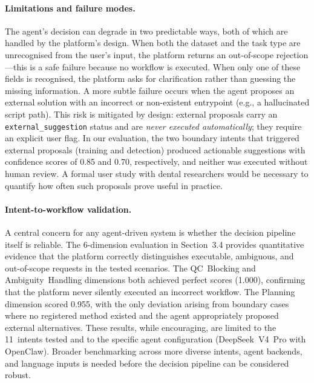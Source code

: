 \paragraph{Limitations and failure modes.}
The agent's decision can degrade in two predictable ways, both of which are handled
by the platform's design. When both the dataset and the task type are unrecognised
from the user's input, the platform returns an out-of-scope rejection---this is a
safe failure because no workflow is executed. When only one of these fields is
recognised, the platform asks for clarification rather than guessing the missing
information. A more subtle failure occurs when the agent proposes an external
solution with an incorrect or non-existent entrypoint (e.g., a hallucinated script
path). This risk is mitigated by design: external proposals carry an
\texttt{external\_suggestion} status and are \textit{never executed automatically};
they require an explicit user flag. In our evaluation, the two boundary intents that
triggered external proposals (training and detection) produced actionable suggestions
with confidence scores of 0.85 and 0.70, respectively, and neither was executed
without human review. A formal user study with dental researchers would be necessary
to quantify how often such proposals prove useful in practice.

\paragraph{Intent-to-workflow validation.}
A central concern for any agent-driven system is whether the decision pipeline
itself is reliable. The 6-dimension evaluation in Section~3.4 provides quantitative
evidence that the platform correctly distinguishes executable, ambiguous, and
out-of-scope requests in the tested scenarios. The QC~Blocking and Ambiguity~Handling
dimensions both achieved perfect scores (1.000), confirming that the platform never
silently executed an incorrect workflow. The Planning dimension scored 0.955, with
the only deviation arising from boundary cases where no registered method existed
and the agent appropriately proposed external alternatives. These results, while
encouraging, are limited to the 11~intents tested and to the specific agent
configuration (DeepSeek~V4~Pro with OpenClaw). Broader benchmarking across more
diverse intents, agent backends, and language inputs is needed before the decision
pipeline can be considered robust.

